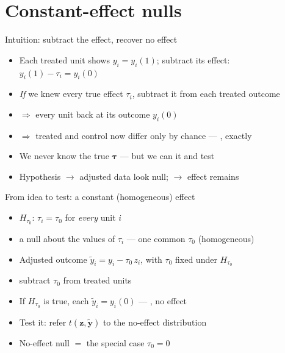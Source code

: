 \documentclass[table, xcolor = {dvipsnames}, 9pt]{beamer}
\theoremstyle{plain}
\newcommand{\mh}[1]{{\color{magenta}{#1}}}
\begin{document}
\section{Constant-effect nulls}
\begin{frame}[t]{Intuition: subtract the effect, recover no effect}
\vfill
\begin{itemize} \vfill
\item Each treated unit shows $y_i = y_i(1)$; subtract its effect: $y_i(1) - \tau_i = y_i(0)$ \vfill
\item \emph{If} we knew every true effect $\tau_i$, subtract it from each treated outcome \vfill
\item[] $\Rightarrow$ every unit back at its \mh{control} outcome $y_i(0)$ \vfill
\item[] $\Rightarrow$ treated and control now differ only by chance --- \mh{no effect}, exactly \vfill
\item We never know the true $\bm{\tau}$ --- but we can \mh{hypothesize} it and test \vfill
\item Hypothesis \mh{true} $\to$ adjusted data look null; \mh{false} $\to$ effect remains \vfill
\end{itemize} \vfill
\end{frame}
\begin{frame}[t]{From idea to test: a constant (homogeneous) effect}
\vfill
\begin{itemize} \vfill
\item \mh{Constant-effect null} $H_{\tau_0}$: $\tau_i = \tau_0$ for \emph{every} unit $i$ \vfill
\item[] a null about the values of $\tau_i$ --- one common $\tau_0$ (homogeneous) \vfill
\item Adjusted outcome $\tilde{y}_i = y_i - \tau_0\, z_i$, with $\tau_0$ fixed under $H_{\tau_0}$ \vfill
\item[] subtract $\tau_0$ from treated units \citep{rosenbaum2002a,rosenbaum2010,rosenbaum2017a} \vfill
\item If $H_{\tau_0}$ is true, each $\tilde{y}_i = y_i(0)$ --- \mh{fixed}, no effect \vfill
\item Test it: refer $t(\bm{z}, \tilde{\bm{y}})$ to the no-effect distribution \vfill
\item No-effect null $=$ the special case $\tau_0 = 0$ \vfill
\end{itemize} \vfill
\end{frame}
\end{document}
